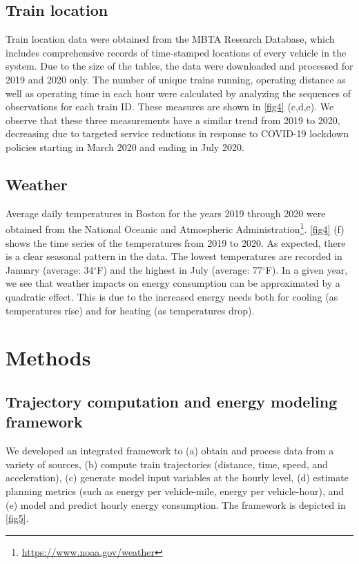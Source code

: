 \documentclass[times]{TRR}
\begin{document}
\subsection{Train location}
Train location data were obtained from the MBTA Research Database, which includes comprehensive records of time-stamped locations of every vehicle in the system. Due to the size of the tables, the data were downloaded and processed for 2019 and 2020 only. The number of unique trains running, operating distance as well as operating time in each hour were calculated by analyzing the sequences of observations for each train ID.  These measures are shown in \autoref{fig4} (c,d,e). We observe that these three measurements have a similar trend from 2019 to 2020, decreasing due to targeted service reductions in response to COVID-19 lockdown policies starting in March 2020 and ending in July 2020.


\subsection{Weather}
Average daily temperatures in Boston for the years 2019 through 2020 were obtained from the 
National Oceanic and Atmospheric Administration\footnote{\url{https://www.noaa.gov/weather}}. \autoref{fig4} (f) shows the time series of the temperatures from 2019 to 2020. As expected, there is a clear seasonal pattern in the data. The lowest temperatures are recorded in January (average: 34$^\circ$F) and the highest in July (average: 77$^\circ$F). In a given year, we see that weather impacts on energy consumption can be approximated by a quadratic effect. This is due to the increased energy needs both for cooling (as temperatures rise) and for heating (as temperatures drop).

\section{Methods}
\subsection{Trajectory computation and energy modeling framework}
We developed an integrated framework to (a) obtain and process data from a variety of sources, (b) compute train trajectories (distance, time, speed, and acceleration), (c) generate model input variables at the hourly level, (d) estimate planning metrics (such as energy per vehicle-mile, energy per vehicle-hour), and (e) model and predict hourly energy consumption. The framework is depicted in \autoref{fig5}.
\end{document}
